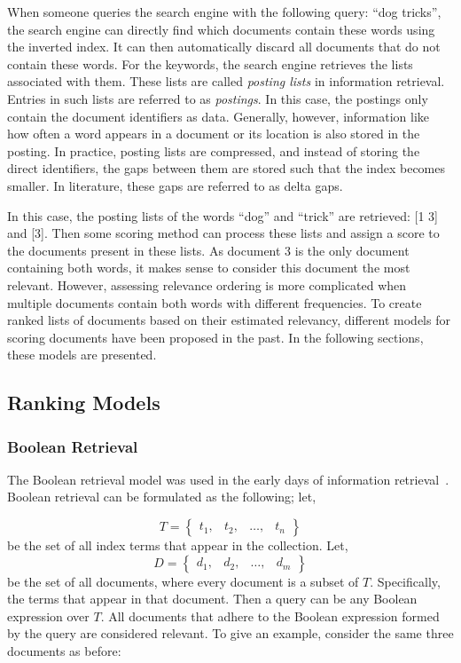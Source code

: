 When someone queries the search engine with the following query: ``dog tricks'', the search engine can directly find which documents contain these words using the inverted index. It can then automatically discard all documents that do not contain these words.
For the keywords, the search engine retrieves the lists associated with them. These lists are called \emph{posting lists} in information retrieval. Entries in such lists are referred to as \emph{postings}. In this case, the postings only contain the document identifiers as data. Generally, however, information like how often a word appears in a document or its location is also stored in the posting. In practice, posting lists are compressed, and instead of storing the direct identifiers, the gaps between them are stored such that the index becomes smaller. In literature, these gaps are referred to as delta gaps. 

In this case, the posting lists of the words ``dog'' and ``trick'' are retrieved: [1 3] and [3]. Then some scoring method can process these lists and assign a score to the documents present in these lists. As document 3 is the only document containing both words, it makes sense to consider this document the most relevant. However, assessing relevance ordering is more complicated when multiple documents contain both words with different frequencies. 
To create ranked lists of documents based on their estimated relevancy, different models for scoring documents have been proposed in the past. In the following sections, these models are presented.

\subsection{Ranking Models}

\subsubsection{Boolean Retrieval}\label{sec:boolean}
The Boolean retrieval model was used in the early days of information retrieval~\citep{boolean-1,boolean-2,rijsbergen79information}. Boolean retrieval can be formulated as the following; let, 

\begin{equation}
	T = \begin{Bmatrix}
		t_1, & t_2, & \ldots, & t_n
	\end{Bmatrix}
\end{equation}
be the set of all index terms that appear in the collection. Let,
\begin{equation}
	D = \begin{Bmatrix}
		d_1, & d_2, & \ldots, & d_m
	\end{Bmatrix}
\end{equation}
be the set of all documents, where every document is a subset of $T$. Specifically, the terms that appear in that document. Then a query can be any Boolean expression over $T$. All documents that adhere to the Boolean expression formed by the query are considered relevant. To give an example, consider the same three documents as before:

